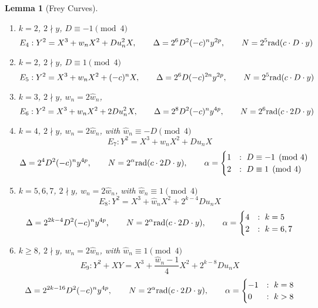 \documentclass[12pt]{amsart}
\newtheorem{lem}[thm]{Lemma}
\theoremstyle{definition}
\newcommand{\rad}{{\rm{rad}}}
\newcommand{\notdiv}{\nmid}
\begin{document}
\begin{lem}[Frey Curves]
\begin{enumerate}[1.]
\item $k = 2$, $2 \notdiv y$, $D \equiv -1 \pmod{4}$
\[ E_{4} : Y^2 = X^3 + w_nX^2 +Du_n^2X, \qquad \Delta = 2^{6}D^2(-c)^ny^{2p}, \qquad N = 2^{5}\rad( c \cdot D \cdot y )  \]

\item $k = 2$, $2 \notdiv y$,  $D \equiv 1 \pmod{4}$
\[E_{5} : Y^2 = X^3 +w_nX^2 +(-c)^nX, \qquad \Delta = 2^{6}D(-c)^{2n}y^{2p}, \qquad N = 2^{5}\rad( c \cdot D \cdot y )  \]

\item $k = 3$, $2 \notdiv y$, $w_n = 2 \hat{w}_n$, 
\[ E_{6} : Y^2 = X^3 + w_nX^2 + 2Du_n^2X, \qquad  \Delta = 2^8D^2(-c)^ny^{4p} , \qquad N = 2^6 \rad( c \cdot 2D \cdot y)  \]

\item $k=4$, $2 \notdiv y$, $w_n = 2 \hat{w}_n$,  with $\hat{w}_n \equiv -D \pmod{4}$
\[ E_{7} : Y^2 = X^3 +\hat{w}_nX^2 + D u_n X\]
 \[ \Delta = 2^4D^2(-c)^ny^{4p}, \qquad N = 2^\alpha \rad( c \cdot 2D \cdot y) ,  \qquad \alpha =  \begin{cases} 1 & : \ D \equiv -1 \pmod{4}\\ 2 & : \ D \equiv 1 \pmod{4} \end{cases} \]


\item $k = 5,6,7$, $2 \notdiv y$, $w_n = 2 \hat{w}_n$, with $\hat{w}_n \equiv 1 \pmod{4}$
\[ E_{8} : Y^2 = X^3 + \hat{w}_nX^2 + 2^{k-4}D u_n X \]
\[ \Delta = 2^{2k-4}D^2(-c)^ny^{4p}, \qquad N = 2^\alpha \rad(c \cdot 2D \cdot y ) ,  \qquad \alpha =  \begin{cases} 4 &:  \ k = 5 \\ 2 &:  \ k = 6,7 \end{cases} \]


\item $k\geq 8$, $2 \notdiv y$, $w_n = 2 \hat{w}_n$, with $\hat{w}_n \equiv 1 \pmod{4}$
\[ E_{9} : Y^2 + XY = X^3 + \frac{\hat{w}_n-1}{4} X^2 + 2^{k-8}D u_n X \]
\[ \Delta = 2^{2k-16}D^2(-c)^ny^{4p}, \qquad N = 2^\alpha \rad(c \cdot 2D \cdot y) ,  \qquad \alpha =  \begin{cases} -1&: \ k = 8 \\ 0 &: \ k > 8 \end{cases} \]


\end{enumerate}
\end{lem}
\end{document}
